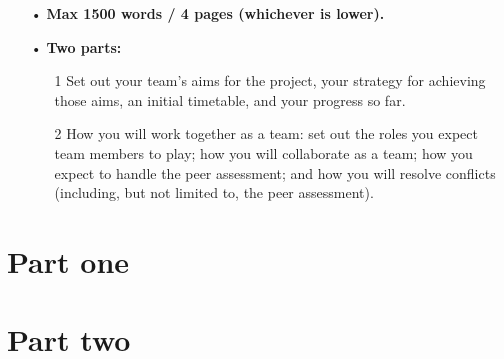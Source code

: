 \documentclass[11pt]{article}
\begin{document}
\begin{itemize}
\item[•] \textbf{Max 1500 words / 4 pages (whichever is lower).}
\item[•] \textbf{Two parts:}
	\begin{itemize}
	\item[1] Set out your team’s aims for the project, your strategy for achieving those aims, an initial timetable, and your progress so far.
	\item[2] How you will work together as a team: set out the roles you expect team members to play; how you will collaborate as a team; how you expect to handle the peer assessment; and how you will resolve conflicts (including, but not limited to, the peer assessment).
	\end{itemize}
\end{itemize} 



\section{Part one}


\section{Part two}

\end{document}
